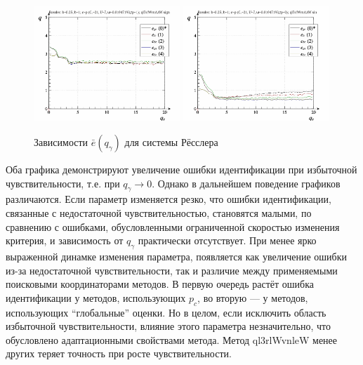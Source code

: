 \begin{figure}[ht!]
\begin{center}
  \includegraphics[width=0.49\textwidth]{p/cha/ross/ross_id-p_q_gamma_ql3rlWvnAAW_sign.png}
  \hfill
  \includegraphics[width=0.49\textwidth]{p/cha/ross/ross_id-p_q_gamma_ql3rlWvnAAW_sin.png}
\end{center}
  \caption{Зависимости $\bar{e}(q_\gamma)$ для системы Рёсслера}
\label{atu:f:ross_e_q_gamma}
\end{figure}

Оба графика демонстрируют увеличение ошибки идентификации при избыточной чувствительности,
т.е. при $q_\gamma \to 0 $.
Однако в дальнейшем поведение графиков различаются. Если
параметр изменяется резко, что ошибки идентификации, связанные с
недостаточной чувствительностью, становятся малыми, по сравнению с ошибками,
обусловленными
ограниченной скоростью изменения критерия, и зависимость от $q_\gamma$
практически отсутствует. При менее ярко выраженной динамке изменения параметра,
появляется как увеличение ошибки из-за недостаточной чувствительности,
так и различие между применяемыми поисковыми координаторами методов.
В первую очередь растёт ошибка идентификации у методов, использующих $p_c$,
во вторую --- у методов, использующих ``глобальные'' оценки.
Но в целом, если исключить область избыточной чувствительности,
влияние этого параметра незначительно, что обусловлено
адаптационными свойствами метода.
Метод ql3rlWvnleW менее других теряет точность при росте чувствительности.

